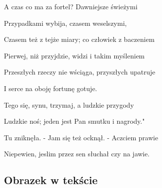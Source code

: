 \documentclass{article}
\begin{document}
A czas co ma za fortel? Dawniejsze świeżymi

Przypadkami wybija, czasem weselszymi,

Czasem też z tejże miary; co człowiek z baczeniem

Pierwej, niż przyjdzie, widzi i takim myśleniem

Przeszłych rzeczy nie wściąga, przyszłych upatruje

I serce na oboję fortunę gotuje.

Tego się, synu, trzymaj, a ludzkie przygody

Ludzkie noś; jeden jest Pan smutku i nagrody."

Tu zniknęła. - Jam się też ocknął. - Aczciem prawie

Niepewien, jeslim przez sen słuchał czy na jawie.

\newpage
\subsection{Obrazek  w tekście} 
\end{document}
